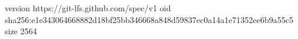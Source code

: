 version https://git-lfs.github.com/spec/v1
oid sha256:e1e343064668882d18bf25bb346668a848d59837ec0a14a1e71352ee6b9a55c5
size 2564
